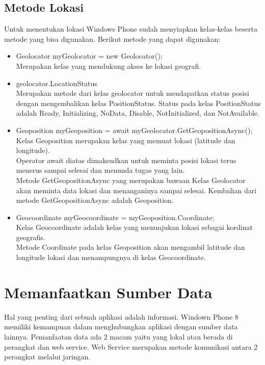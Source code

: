 \subsection{Metode Lokasi}
\label{subsec:Metode Lokasi}
\hspace{0.5cm} Untuk menentukan lokasi Windows Phone sudah menyiapkan kelas-kelas beserta metode yang bisa digunakan. Berikut metode yang dapat digunakan:
\begin{itemize}
	\item Geolocator myGeolocator = new Geolocator();\\
	Merupakan kelas yang mendukung akses ke lokasi geografi.
	\item geolocator.LocationStatus\\
	Merupakan metode dari kelas geolocator untuk mendapatkan status posisi dengan mengembalikan kelas PositionStatus. Status pada kelas PositionStatus adalah Ready, Initializing, NoData, Disable, NotInitialized, dan NotAvailable.
	\item Geoposition myGeoposition = await myGeolocator.GetGeopositionAsync(); \\
		Kelas Geoposition merupakan kelas yang memuat lokasi (latitude dan longitude). \\
		Operator await diatas dimaksudkan untuk meminta posisi lokasi terus menerus sampai selesai dan menunda tugas yang lain. \\
		Metode GetGeopositionAsync yang merupakan bawaan Kelas Geolocator akan meminta data lokasi dan menanganinya sampai selesai.
		Kembalian dari metode GetGeopositionAsync adalah Geoposition.
	\item Geocoordinate myGeocoordinate = myGeoposition.Coordinate;\\
	Kelas Geocoordinate adalah kelas yang menunjukan lokasi sebagai kordinat geografis. \\
	Metode Coordinate pada kelas Geoposition akan mengambil latitude dan longitude lokasi dan menampungnya di kelas Geocoordinate.	
\end{itemize}
 

\section{Memanfaatkan Sumber Data}
\label{sec:Memanfaatkan Sumber Data}
\hspace{0.5cm} Hal yang penting dari sebuah aplikasi adalah informasi. Windown Phone 8 memiliki kemampuan dalam menghubungkan aplikasi dengan sumber data lainnya. Pemanfaatan data ada 2 macam yaitu yang lokal atau berada di perangkat dan web service. Web Service merupakan metode komunikasi antara 2 perangkat melalui jaringan. 

